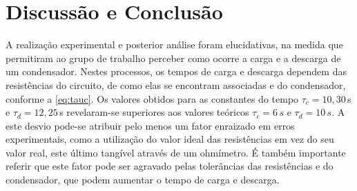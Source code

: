 \section{Discussão e Conclusão}

A realização experimental e posterior análise foram elucidativas, na medida que permitiram ao grupo de trabalho perceber como ocorre a carga e a descarga de um condensador. Nestes processos, os tempos de carga e descarga dependem das resistências do circuito, de como elas se encontram associadas e do condensador, conforme a \cref{eq:tauc}.
Os valores obtidos para as constantes do tempo $\tau_c = 10,30\,$s e $\tau_d = 12,25$\,s revelaram-se superiores aos valores teóricos $\tau_c = 6\,s$ e $\tau_d = 10\,s$.
A este desvio pode-se atribuir pelo menos um fator enraizado em erros experimentais, como a utilização do valor ideal das resistências em vez do seu valor real, este último tangível através de um ohmímetro. É também importante referir que este fator pode ser agravado pelas tolerâncias das resistências e do condensador, que podem aumentar o tempo de carga e descarga.






